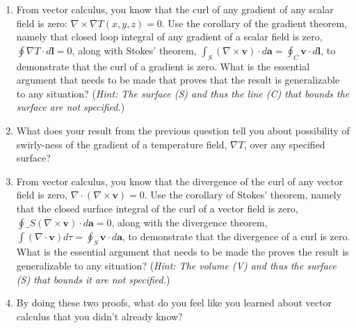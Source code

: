 \documentclass[11pt]{article}
\def\tightlist{}
\begin{document}
\begin{enumerate}
\def\labelenumi{\arabic{enumi}.}
\tightlist
\item
  From vector calculus, you know that the curl of any gradient of any
  scalar field is zero: $\nabla \times \nabla T(x,y,z) = 0 $. Use the
  corollary of the gradient theorem, namely that closed loop integral of
  any gradient of a scalar field is zero,
  $\oint \nabla T\cdot d\mathbf{l} = 0$, along with Stokes' theorem,
  $\int_S(\nabla \times \mathbf{v})\cdot d\mathbf{a} = \oint_C \mathbf{v}\cdot d\mathbf{l}$,
  to demonstrate that the curl of a gradient is zero. What is the
  essential argument that needs to be made that proves that the result
  is generalizable to any situation? (\emph{Hint: The surface (S) and
  thus the line (C) that bounds the surface are not specified.})
\item
  What does your result from the previous question tell you about
  possibility of swirly-ness of the gradient of a temperature field,
  \(\nabla T\), over any specified surface?
\item
  From vector calculus, you know that the divergence of the curl of any
  vector field is zero, \(\nabla \cdot (\nabla \times \mathbf{v}) = 0\).
  Use the corollary of Stokes' theorem, namely that the closed surface
  integral of the curl of a vector field is zero, $\oint\_S
  (\nabla \times \mathbf{v})\cdot d\mathbf{a} = 0 $, along with the
  divergence theorem,
  \(\int(\nabla \cdot \mathbf{v}) d\tau = \oint_S \mathbf{v}\cdot d\mathbf{a}\),
  to demonstrate that the divergence of a curl is zero. What is the
  essential argument that needs to be made the proves the result is
  generalizable to any situation? (\emph{Hint: The volume (V) and thus
  the surface (S) that bounds it are not specified.})
\item
  By doing these two proofs, what do you feel like you learned about
  vector calculus that you didn't already know?
\end{enumerate}
\end{document}
